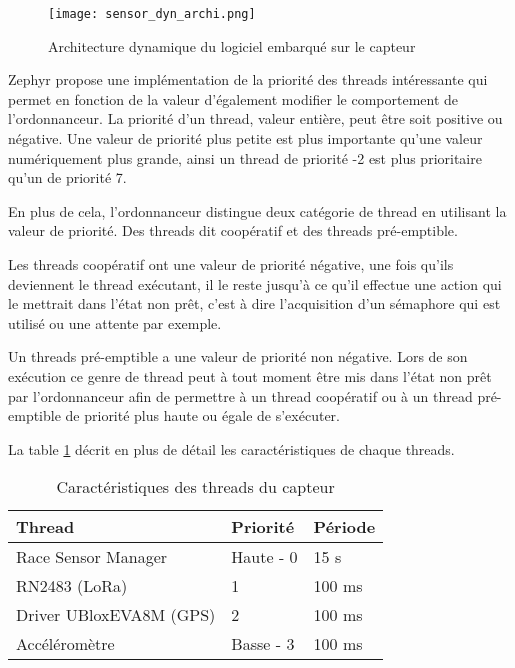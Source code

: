 
\begin{figure}[htb]
\centering 
\texttt{[image: sensor\_dyn\_archi.png]} 
\caption{Architecture dynamique du logiciel embarqué sur le capteur}
\label{fig:sensor_dyn_archi}
\end{figure}

Zephyr propose une implémentation de la priorité des threads intéressante qui permet en fonction de la valeur d'également modifier le comportement de l'ordonnanceur. La priorité d'un thread, valeur entière, peut être soit positive ou négative. Une valeur de priorité plus petite est plus importante qu'une valeur numériquement plus grande, ainsi un thread de priorité -2 est plus prioritaire qu'un de priorité 7.

En plus de cela, l'ordonnanceur distingue deux catégorie de thread en utilisant la valeur de priorité. Des threads dit coopératif et des threads pré-emptible.

Les threads coopératif ont une valeur de priorité négative, une fois qu'ils deviennent le thread exécutant, il le reste jusqu'à ce qu'il effectue une action qui le mettrait dans l'état non prêt, c'est à dire l'acquisition d'un sémaphore qui est utilisé ou une attente par exemple.

Un threads pré-emptible a une valeur de priorité non négative. Lors de son exécution ce genre de thread peut à tout moment être mis dans l'état non prêt par l'ordonnanceur afin de permettre à un thread coopératif ou à un thread pré-emptible de priorité plus haute ou égale de s'exécuter. \cite{zephyr_web}

La table \ref{tab:threads_cara} décrit en plus de détail les caractéristiques de chaque threads.

\begin{table}[htb]
\caption{Caractéristiques des threads du capteur}
\label{tab:threads_cara}
\centering
\begin{tabular}{ l l l }
\toprule
Thread & Priorité & Période \\
\midrule
Race Sensor Manager & Haute - 0 & 15 s  \\
RN2483 (LoRa) & 1 & 100 ms  \\
Driver UBloxEVA8M (GPS) & 2 & 100 ms  \\
Accéléromètre & Basse - 3 & 100 ms  \\
\bottomrule 
\end{tabular}
\end{table}

